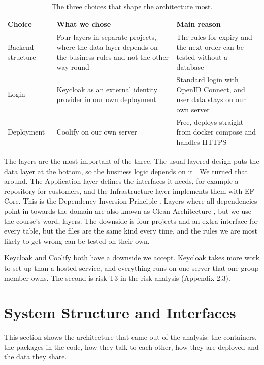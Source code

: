 \begin{table}[H]
    \centering
    \begin{tabular}{@{}p{3.2cm} p{5.4cm} p{5.6cm}@{}}
        \hline
        Choice & What we chose & Main reason \\
        \hline
        Backend structure & Four layers in separate projects, where the data layer depends on the business rules and not the other way round & The rules for expiry and the next order can be tested without a database \\
        Login & Keycloak as an external identity provider in our own deployment & Standard login with OpenID Connect, and user data stays on our own server \\
        Deployment & Coolify on our own server & Free, deploys straight from docker compose and handles HTTPS \\
        \hline
    \end{tabular}
    \caption{The three choices that shape the architecture most.}
    \label{tab:arch-choices}
\end{table}

The layers are the most important of the three. The usual layered design puts the
data layer at the bottom, so the business logic depends on it
\cite[ch.~5]{microsoft-application-architecture-guide}. We turned that around. The
Application layer defines the interfaces it needs, for example a repository for
customers, and the Infrastructure layer implements them with EF Core. This is the
Dependency Inversion Principle \cite[ch.~4, pp.~139--141]{freeman-head-first-design-patterns}.
Layers where all dependencies point in towards the domain are also known as Clean
Architecture \cite[sec.~8.4.1]{goldman-maui-in-action}, but we use the course's word,
layers.
The downside is four projects and an extra interface for every table, but the files are the
same kind every time, and the rules we are most likely to get wrong can be tested on
their own.

Keycloak and Coolify both have a downside we accept. Keycloak takes more work to set up
than a hosted service, and everything runs on one server that one group member owns. The
second is risk T3 in the risk analysis (Appendix 2.3).

\section{System Structure and Interfaces}\label{sec:arch-structure}

This section shows the architecture that came out of the analysis: the containers, the
packages in the code, how they talk to each other, how they are deployed and the data
they share.

